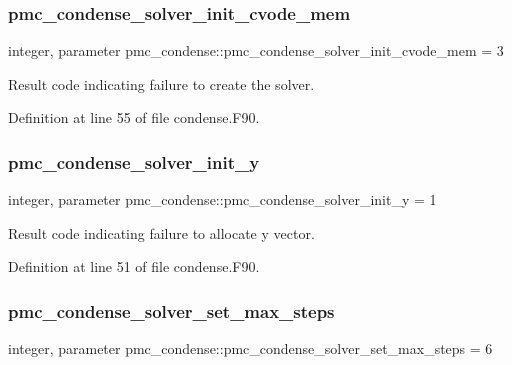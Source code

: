 \subsubsection{\texorpdfstring{pmc\+\_\+condense\+\_\+solver\+\_\+init\+\_\+cvode\+\_\+mem}{pmc\_condense\_solver\_init\_cvode\_mem}}
{\footnotesize\ttfamily integer, parameter pmc\+\_\+condense\+::pmc\+\_\+condense\+\_\+solver\+\_\+init\+\_\+cvode\+\_\+mem = 3}



Result code indicating failure to create the solver. 



Definition at line 55 of file condense.\+F90.

\mbox{\label{namespacepmc__condense_a361258031530fbffce78f9296be23482}} 
\subsubsection{\texorpdfstring{pmc\+\_\+condense\+\_\+solver\+\_\+init\+\_\+y}{pmc\_condense\_solver\_init\_y}}
{\footnotesize\ttfamily integer, parameter pmc\+\_\+condense\+::pmc\+\_\+condense\+\_\+solver\+\_\+init\+\_\+y = 1}



Result code indicating failure to allocate {\ttfamily y} vector. 



Definition at line 51 of file condense.\+F90.

\mbox{\label{namespacepmc__condense_acf6e894f8461ba22f0e7b8d4b55bdbdb}} 
\subsubsection{\texorpdfstring{pmc\+\_\+condense\+\_\+solver\+\_\+set\+\_\+max\+\_\+steps}{pmc\_condense\_solver\_set\_max\_steps}}
{\footnotesize\ttfamily integer, parameter pmc\+\_\+condense\+::pmc\+\_\+condense\+\_\+solver\+\_\+set\+\_\+max\+\_\+steps = 6}




